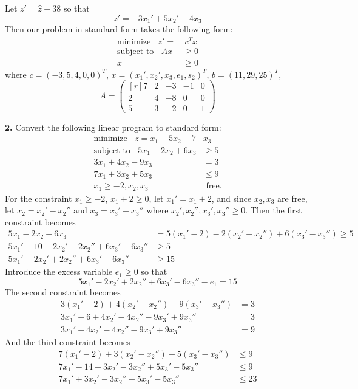 \documentclass{article}
\begin{document}
Let $z' = \hat{z} + 38$ so that
\[z' = -3x_1' + 5x_2' + 4x_3\]
Then our problem in standard form takes the following form:
\begin{align*}
    \text{minimize} \:\:\:\: z' =&\: c^Tx \\
    \text{subject to} \:\:\:\: Ax &\geq 0\\
    x &\geq 0
\end{align*}
where $c = (-3,5,4,0,0)^T$, $x = (x_1', x_2', x_3, e_1, s_2)^T$, $b = (11, 29, 25)^T$,
\[A = \begin{pmatrix*}[r]
    7 & 2 & -3 & -1 & 0\\
    2 & 4 & -8 & 0 & 0\\
    5 & 3 & -2 & 0 & 1
\end{pmatrix*}\]

\textbf{2.} Convert the following linear program to standard form:
\begin{align*}
    \text{minimize} \:\:\:\: z = x_1 - 5x_2 - 7&x_3\\
    \text{subject to} \:\:\:\: 5x_1 - 2x_2 + 6x_3 &\geq 5\\
    3x_1 + 4x_2 - 9x_3 &= 3\\
    7x_1 + 3x_2 + 5x_3 &\leq 9\\
    x_1 \geq -2, x_2,x_3 & \text{ free.}
\end{align*}
For the constraint $x_1 \geq -2$, $x_1 + 2 \geq 0$, let $x_1' = x_1 + 2$, and since $x_2, x_3$ are free, let $x_2 = x_2' - x_2''$ and $x_3 = x_3' - x_3''$ where $x_2',x_2'', x_3',x_3'' \geq 0$. Then the first constraint becomes
\begin{align*}
    5x_1 - 2x_2 + 6x_3 &= 5(x_1' - 2) - 2(x_2' - x_2'') + 6(x_3' - x_3'') \geq 5\\
    5x_1' - 10 - 2x_2' + 2x_2'' + 6x_3' - 6x_3'' &\geq 5\\
    5x_1' - 2x_2' + 2x_2'' + 6x_3' - 6x_3'' &\geq 15
\end{align*}
Introduce the excess variable $e_1 \geq 0$ so that 
\[5x_1' - 2x_2' + 2x_2'' + 6x_3' - 6x_3'' - e_1 = 15\]
The second constraint becomes
\begin{align*}
    3(x_1' - 2) + 4(x_2' - x_2'') - 9(x_3'- x_3'') &= 3\\
    3x_1' - 6 + 4x_2' - 4x_2'' - 9x_3' + 9x_3'' &= 3\\
    3x_1' + 4x_2' - 4x_2'' - 9x_3' + 9x_3'' &= 9
\end{align*}
And the third constraint becomes
\begin{align*}
    7(x_1' - 2) + 3(x_2' - x_2'') + 5(x_3' - x_3'') &\leq 9\\
    7x_1' - 14 + 3x_2' - 3x_2'' + 5x_3' - 5x_3'' &\leq 9\\
    7x_1' + 3x_2' - 3x_2'' + 5x_3' - 5x_3'' &\leq 23
\end{align*}
\end{document}

